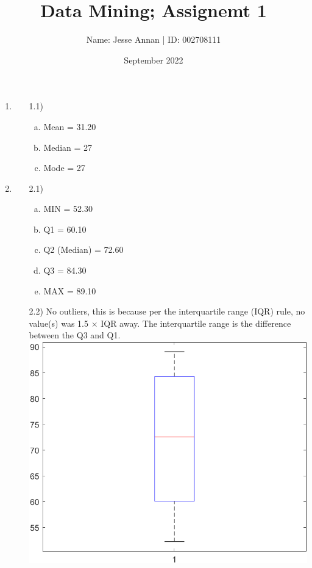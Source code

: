 \documentclass[12pt]{article}
\title{Data Mining; Assignemt 1}
\author{Name: Jesse Annan \hspace{0.5cm} | \hspace{0.5cm} ID: 002708111}
\date{September 2022}
\begin{document}
\maketitle

\clearpage

\begin{enumerate}[1.]
    \item \begin{enumerate}
        \item[1.1)] \begin{enumerate}[(a)]
            \item Mean = 31.20
            \item Median = 27
            \item Mode = 27
        \end{enumerate} 
    \end{enumerate}

    \item \begin{enumerate}
        \item[2.1)] \begin{enumerate}[(a)]
            \item MIN = 52.30
            \item Q1 = 60.10
            \item Q2 (Median) = 72.60
            \item Q3 = 84.30
            \item MAX = 89.10
        \end{enumerate}

        \item[2.2)] No outliers, this is because per the interquartile range (IQR) rule, no value(s) was 1.5 $\times$ IQR away. The interquartile range is the difference between the Q3 and Q1. \newline \\
        \includegraphics[scale=0.7]{boxplot_q2.png}
        

\end{enumerate}
\end{enumerate}
\end{document}
